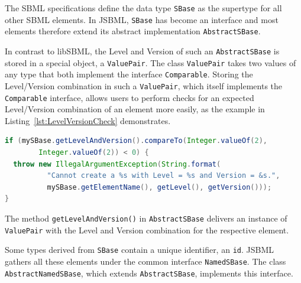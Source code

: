 The SBML specifications define the data type
\texttt{SBase} as the
supertype for all other SBML elements. In JSBML, \texttt{SBase} has become an
interface and most elements therefore extend its abstract implementation
\texttt{AbstractSBase}.

In contrast to libSBML, the Level and Version of such an \texttt{AbstractSBase}
is stored in a special object, a \texttt{ValuePair}.
%
The class \texttt{ValuePair} takes two values of any type that both implement
the interface \texttt{Comparable}.
%
Storing the Level/Version combination in such a \texttt{ValuePair}, which itself
implements the \texttt{Comparable} interface, allows users to perform checks for
an expected Level/Version combination of an element more easily, as the example
in Listing~\vref{lst:LevelVersionCheck} demonstrates.
\begin{lstlisting}[language=Java,float=h,caption={Check for a minimal expected Level/Version combination},label={lst:LevelVersionCheck}]
if (mySBase.getLevelAndVersion().compareTo(Integer.valueOf(2),
        Integer.valueOf(2)) < 0) {
  throw new IllegalArgumentException(String.format(
          "Cannot create a %s with Level = %s and Version = &s.",
          mySBase.getElementName(), getLevel(), getVersion()));
}
\end{lstlisting}
The method \texttt{getLevelAndVersion()} in \texttt{AbstractSBase}
%
delivers an instance of \texttt{ValuePair}
%
with the Level and Version combination for the respective element.

Some types derived from \texttt{SBase} contain a unique identifier, an
\texttt{id}. JSBML gathers all these elements under the common interface
\texttt{NamedSBase}. The class \texttt{AbstractNamedSBase}, which extends
\texttt{AbstractSBase}, implements this interface.
%
%

